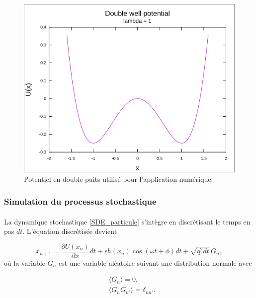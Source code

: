 \begin{figure}
	\centering
	\includegraphics[width=0.8\linewidth]{figures/potential}
	\caption{Potentiel en double puits utilisé pour l'application numérique.}
	\label{fig:potentiel_double_puits}
\end{figure}


\subsubsection{Simulation du processus stochastique}

\paragraph{} La dynamique stochastique \ref{SDE_particule} s'intègre en discrétisant le temps en pas $dt$. L'équation discrétisée devient

\begin{equation}\label{SDE_discrete}
	x_{n+1} = \frac{\partial U(x_n)}{\partial x} dt + \epsilon h(x_n) \cos(\omega t + \phi) dt + \sqrt{q^2 dt} \,G_n,
\end{equation}
où la variable $G_n$ est une variable aléatoire suivant une distribution normale avec 

\begin{equation}\label{G_n}
\begin{split}
	&\langle G_n \rangle = 0,\\
	&\langle G_nG_{n'} \rangle = \delta_{nn'}.
\end{split}
\end{equation}

